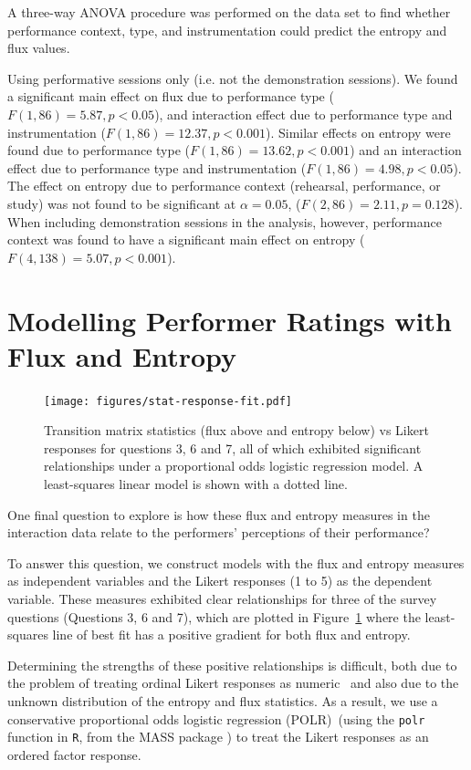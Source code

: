 \documentclass{sigchi}
\begin{document}
A three-way ANOVA procedure was performed on the data set to find
whether performance context, type, and instrumentation could predict
the entropy and flux values.

Using performative sessions only (i.e. not the demonstration
sessions). We found a significant main effect on flux due to
performance type ($F(1,86) = 5.87, p < 0.05$), and interaction
effect due to performance type and instrumentation ($F(1,86) = 12.37, p
< 0.001$). Similar effects on entropy were found due to performance
type ($F(1,86) = 13.62, p < 0.001$) and an interaction effect due to
performance type and instrumentation ($F(1,86) = 4.98, p < 0.05$). The
effect on entropy due to performance context (rehearsal,
performance, or study) was not found to be significant at $\alpha =
0.05$, ($F(2,86) = 2.11, p = 0.128$). When including demonstration
sessions in the analysis, however, performance context was found to
have a significant main effect on entropy ($F(4,138) = 5.07, p <
0.001$).




\section{Modelling Performer Ratings with Flux and Entropy}

\begin{figure}
  \centering
  \texttt{[image: figures/stat-response-fit.pdf]}
  \caption{Transition matrix statistics (flux above and entropy below) vs Likert responses for
    questions 3, 6 and 7, all of which exhibited significant
    relationships under a proportional odds logistic regression model.
    A least-squares linear model is shown with a dotted line.
    \label{fig:stat-response-fit}}
\end{figure}

One final question to explore is how these flux and entropy measures
in the interaction data relate to the performers' perceptions of their
performance?

To answer this question, we construct models with the flux and entropy
measures as independent variables and the Likert responses (1 to 5) as
the dependent variable. These measures exhibited clear relationships
for three of the survey questions (Questions 3, 6 and 7), which are
plotted in Figure~\ref{fig:stat-response-fit} where the least-squares
line of best fit has a positive gradient for both flux and entropy.

Determining the strengths of these positive relationships is
difficult, both due to the problem of treating ordinal Likert
responses as numeric~\cite{Gardner:2007fj} and also
due to the unknown distribution of the entropy and flux statistics. As
a result, we use a conservative proportional odds logistic regression
(POLR)~(using the \texttt{polr} function in \texttt{R}, from the MASS
package \cite{Venables:2002qv}) to treat the Likert responses as an
ordered factor response.
\end{document}
